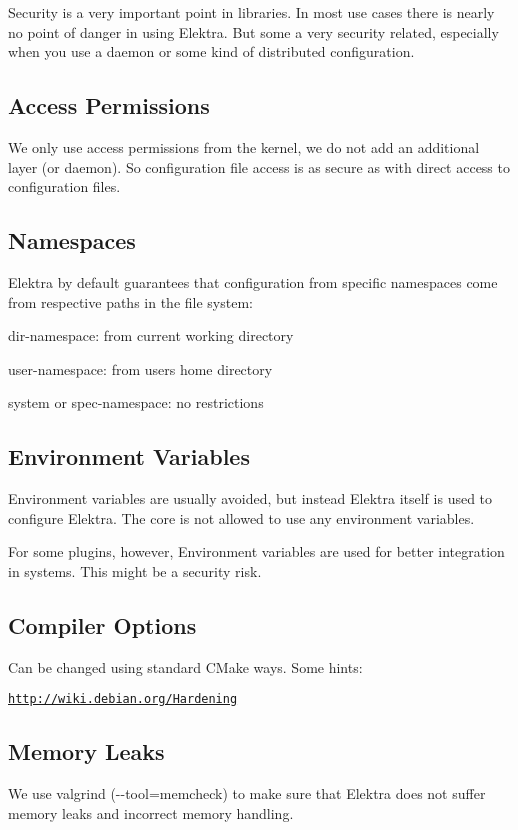 Security is a very important point in libraries. In most use cases there is nearly no point of danger in using Elektra. But some a very security related, especially when you use a daemon or some kind of distributed configuration.

\subsection*{Access Permissions}

We only use access permissions from the kernel, we do not add an additional layer (or daemon). So configuration file access is as secure as with direct access to configuration files.

\subsection*{Namespaces}

Elektra by default guarantees that configuration from specific namespaces come from respective paths in the file system\+:


\begin{DoxyItemize}
\item {\ttfamily dir}-\/namespace\+: from current working directory
\item {\ttfamily user}-\/namespace\+: from users home directory
\item {\ttfamily system} or {\ttfamily spec}-\/namespace\+: no restrictions
\end{DoxyItemize}

\subsection*{Environment Variables}

Environment variables are usually avoided, but instead Elektra itself is used to configure Elektra. The core is not allowed to use any environment variables.

For some plugins, however, Environment variables are used for better integration in systems. This might be a security risk.

\subsection*{Compiler Options}

Can be changed using standard C\+Make ways. Some hints\+:

\href{http://wiki.debian.org/Hardening}{\tt http\+://wiki.\+debian.\+org/\+Hardening}

\subsection*{Memory Leaks}

We use valgrind ({\ttfamily -\/-\/tool=memcheck}) to make sure that Elektra does not suffer memory leaks and incorrect memory handling. 